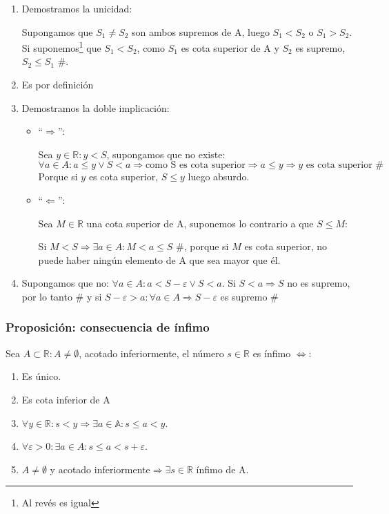 \documentclass[10pt,a4paper,openright]{book}
\theoremstyle{break}
\begin{document}
\begin{enumerate}

\item Demostramos la unicidad:\par
Supongamos que $S_1\neq S_2$ son ambos supremos de A, luego $S_1<S_2$ o $S_1>S_2$. Si suponemos\footnote{Al revés es igual} que $S_1<S_2$, como $S_1$ es cota superior de A y $S_2$ es supremo, $S_2\leq S_1$ \#.

\item Es por definición

\item Demostramos la doble implicación:
	\begin{itemize}
	\item ``$\Rightarrow$'':\par
	Sea $y\in \mathbb R: y<S$, supongamos que no existe:
	$$\forall a \in A: a\leq y \vee S<a\Rightarrow \mbox{como S es cota superior}\Rightarrow a\leq y\Rightarrow y \mbox{ es cota superior \#}$$
	Porque si $y$ es cota superior, $S\leq y$ luego absurdo.
	
	\item ``$\Leftarrow$'':\par
	Sea $M\in \mathbb R$ una cota superior de A, suponemos lo contrario a que $S\leq M$:\par
	Si $M<S\Rightarrow \exists a\in A: M<a\leq S$ \#, porque si $M$ es cota superior, no puede haber ningún elemento de A que sea mayor que él.
	\end{itemize}
	
\item Supongamos que no: $\forall a \in A: a<S-\varepsilon \vee S< a$. Si $S<a\Rightarrow S$ no es supremo, por lo tanto \# y si $S-\varepsilon> a: \forall a \in A\Rightarrow S-\varepsilon$ es supremo \#
\end{enumerate}

\subsubsection{Proposición: consecuencia de ínfimo}
Sea $A\subset \mathbb R: A\neq \emptyset$, acotado inferiormente, el número $s\in \mathbb R$ es ínfimo $\Leftrightarrow$:
\begin{enumerate}
\item  Es único.
\item Es cota inferior de A
\item $\forall y\in \mathbb R: s<y\Rightarrow \exists a\in \mathbb A: s\leq a<y$.
\item $\forall \varepsilon>0: \exists a\in A: s\leq a<s+\varepsilon$.
\item $A\neq \emptyset$ y acotado inferiormente$\Rightarrow \exists s\in \mathbb R$ ínfimo de A.
\end{enumerate}
\end{document}
